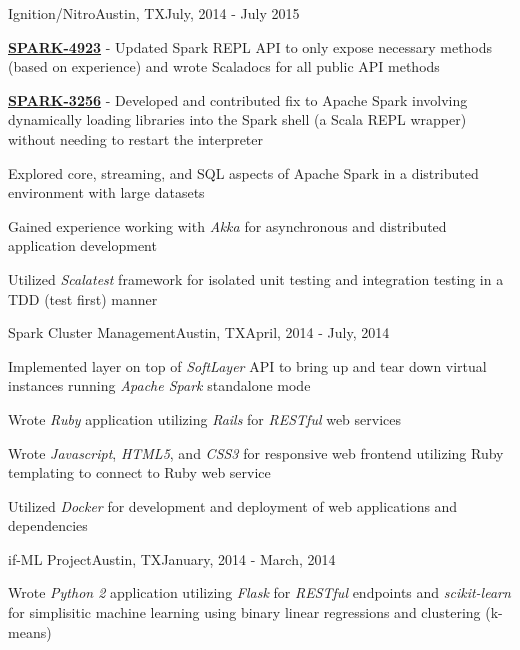 \documentclass[10pt,a4paper]{article}
\begin{document}
{\begin{resumeinfo}{Ignition/Nitro}{Austin, TX}{July, 2014 - July 2015}
        \item \textbf{
            \href{https://issues.apache.org/jira/browse/SPARK-4923}{SPARK-4923}        
        } - Updated Spark REPL API to only expose necessary methods (based on 
        experience) and wrote Scaladocs for all public API methods
    
        \item \textbf{
            \href{https://issues.apache.org/jira/browse/SPARK-3256}{SPARK-3256}
        } - Developed and contributed fix to Apache Spark involving dynamically
        loading libraries into the Spark shell (a Scala REPL wrapper) without
        needing to restart the interpreter

        \item Explored core, streaming, and SQL aspects of Apache Spark in a
        distributed environment with large datasets

        \item Gained experience working with \textit{Akka} for asynchronous
        and distributed application development

        \item Utilized \textit{Scalatest} framework for isolated unit testing
        and integration testing in a TDD (test first) manner
    \end{resumeinfo}
    \addvspace{1em}
    \begin{resumeinfo}{Spark Cluster Management}{Austin, TX}{April, 2014 - July, 2014}
        \item Implemented layer on top of \textit{SoftLayer} API to bring up
        and tear down virtual instances running \textit{Apache Spark} standalone mode

        \item Wrote \textit{Ruby} application utilizing \textit{Rails} for
        \textit{RESTful} web services

        \item Wrote \textit{Javascript}, \textit{HTML5}, and \textit{CSS3} for
        responsive web frontend utilizing Ruby templating to connect to Ruby 
        web service

        \item Utilized \textit{Docker} for development and deployment of web
        applications and dependencies
    \end{resumeinfo}
    \addvspace{1em}
    \begin{resumeinfo}{if-ML Project}{Austin, TX}{January, 2014 - March, 2014}
        \item Wrote \textit{Python 2} application utilizing \textit{Flask} for
        \textit{RESTful} endpoints and \textit{scikit-learn} for simplisitic
        machine learning using binary linear regressions and clustering 
        (k-means)


\end{resumeinfo}}
\end{document}
